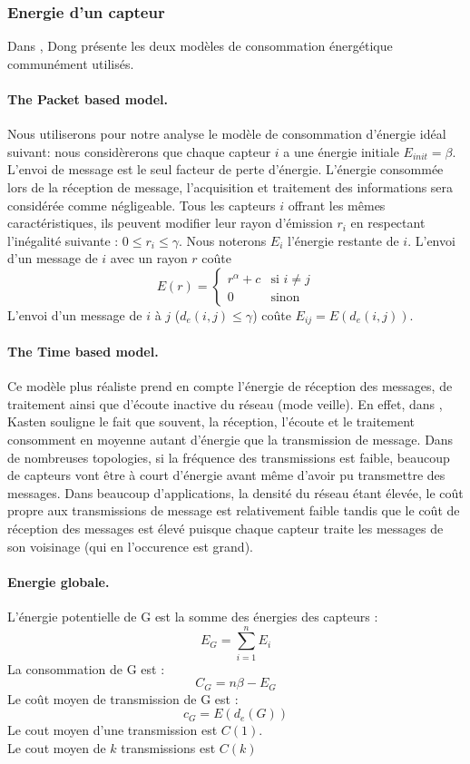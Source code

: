 \subsubsection{Energie d'un capteur}
Dans \cite{Dong2005}, Dong présente les deux modèles de consommation énergétique communément utilisés.
\paragraph{The Packet based model.\label{packet_based_model}}
Nous utiliserons pour notre analyse le modèle de consommation d'énergie idéal suivant:
nous considèrerons que chaque capteur $i$ a une énergie initiale $E_{init}=\beta$.
L'envoi de message est le seul facteur de perte d'énergie. L'énergie consommée lors de la réception de message, l'acquisition et traitement des informations sera considérée comme négligeable.
Tous les capteurs $i$ offrant les mêmes caractéristiques, ils peuvent modifier leur rayon d'émission $r_i$ en respectant l'inégalité suivante : $0 \leq r_i \leq \gamma$.
Nous noterons $E_i$ l'énergie restante de $i$.
L'envoi d'un message de $i$ avec un rayon $r$ coûte $$ E(r)= \begin{cases} r^\alpha + c & \text{si }i\neq j \\ 0 & \text{sinon}  \end{cases}$$
L'envoi d'un message de $i$ à $j$ ($d_e(i,j)\leq \gamma$) coûte  $ E_{ij}=E(d_e(i,j))$.

\paragraph{The Time based model.}
Ce modèle plus réaliste prend en compte l'énergie de réception des messages, de traitement ainsi que d'écoute inactive du réseau (mode veille).
En effet, dans \cite{Kasten2001}, Kasten souligne le fait que souvent, la réception, l'écoute et le traitement consomment en moyenne autant d'énergie que la transmission de message.
Dans de nombreuses topologies, si la fréquence des transmissions est faible, beaucoup de capteurs vont être à court d'énergie avant même d'avoir pu transmettre des messages.
Dans beaucoup d'applications, la densité du réseau étant élevée, le coût propre aux transmissions de message est relativement faible tandis que le coût de réception des messages est élevé puisque chaque capteur traite les messages de son voisinage (qui en l'occurence est grand).



\paragraph{Energie globale.}
\begin{mydef}
 L'énergie potentielle de G est la somme des énergies des capteurs :$$E_G=\sum_{i=1}^n{E_i}$$
 La consommation de  G est :$$C_G=n\beta - E_G$$
 Le coût moyen de transmission de  G est :$$c_G=E(d_e(G))$$
 Le cout moyen d'une transmission est $C(1)$.\\
 Le cout moyen de $k$ transmissions est $C(k)$
\end{mydef}


